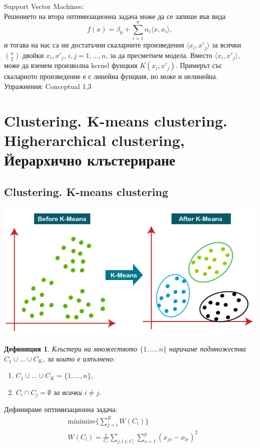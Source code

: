 \documentclass{article}
\newtheorem{definition}{Дефиниция}
\begin{document}
Support Vector Machines:\\
Решението на втора оптимизационна задача може да се запише във вида
 $$ f(x) = \beta_0 + \sum_{i=1}^n \alpha_i \langle x,x_i \rangle , $$
 и тогава на нас са ни достатъчни скаларните произведения $ \langle x_i,x'_j \rangle $ за всички $ \binom{n}{2} $ двойки $x_i,x'_j $, $i,j = 1, \dots,n $, за да пресметнем модела.	
Вместо 	$ \langle x_i,x'_j \rangle $, може да вземем произволна kernel фунцкия $ K( x_i,x'_j ) $. Примерът със скаларното произведение 
е с линейна фунцкия, но може и нелинейна. \\

Упражнения: Conceptual 1,3 
	
\newpage
\section{Clustering. K-means clustering. Higherarchical clustering, Йерархично клъстериране}	
	\subsection{Clustering. K-means clustering}
	\includegraphics[scale=0.5]{k-means-clustering.png}
	\begin{definition}
		Клъстери на множеството $\{1, \dots, n\}$ наричаме подмножества $C_1 \cup \dots \cup C_K$, за които е изпълнено:
		\begin{enumerate}
			\item $C_1 \cup \dots \cup C_K = \{1, \dots, n\} ,$ 
			\item $C_i \cap C_j = \emptyset $ за всички $i \neq j.$
		\end{enumerate}
	\end{definition}

	Дефинираме оптимизационна задача:\\
	\begin{align}
	& \text{minimize} \Big\{ \sum_{j=i}^K W(C_i) \Big\} \\
		& W(C_i) = \frac{1}{C_i} \sum_{j,l \in C_i} \sum_{s=1}^p (x_{js}-x_{ls}) ^2
	\end{align}
\end{document}
